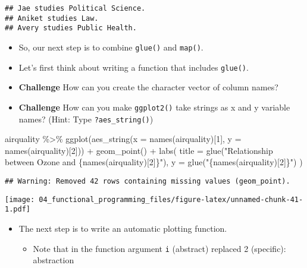 \documentclass[
]{book}
\newenvironment{Shaded}{\begin{snugshade}}{\end{snugshade}}
\newcommand{\AttributeTok}[1]{\textcolor[rgb]{0.77,0.63,0.00}{#1}}
\newcommand{\DecValTok}[1]{\textcolor[rgb]{0.00,0.00,0.81}{#1}}
\newcommand{\FunctionTok}[1]{\textcolor[rgb]{0.00,0.00,0.00}{#1}}
\newcommand{\NormalTok}[1]{#1}
\newcommand{\SpecialCharTok}[1]{\textcolor[rgb]{0.00,0.00,0.00}{#1}}
\newcommand{\StringTok}[1]{\textcolor[rgb]{0.31,0.60,0.02}{#1}}
\providecommand{\tightlist}{%
  \setlength{\itemsep}{0pt}\setlength{\parskip}{0pt}}
\begin{document}
\begin{verbatim}
## Jae studies Political Science.
## Aniket studies Law.
## Avery studies Public Health.
\end{verbatim}

\begin{itemize}
\item
  So, our next step is to combine \texttt{glue()} and \texttt{map()}.
\item
  Let's first think about writing a function that includes \texttt{glue()}.
\item
  \textbf{Challenge}
  How can you create the character vector of column names?
\item
  \textbf{Challenge}
  How can you make \texttt{ggplot2()} take strings as x and y variable names? (Hint: Type \texttt{?aes\_string()})
\end{itemize}

\begin{Shaded}
\begin{Highlighting}[]
\NormalTok{airquality }\SpecialCharTok{\%\textgreater{}\%}
  \FunctionTok{ggplot}\NormalTok{(}\FunctionTok{aes\_string}\NormalTok{(}\AttributeTok{x =} \FunctionTok{names}\NormalTok{(airquality)[}\DecValTok{1}\NormalTok{], }\AttributeTok{y =} \FunctionTok{names}\NormalTok{(airquality)[}\DecValTok{2}\NormalTok{])) }\SpecialCharTok{+}
  \FunctionTok{geom\_point}\NormalTok{() }\SpecialCharTok{+}
  \FunctionTok{labs}\NormalTok{(}
    \AttributeTok{title =} \FunctionTok{glue}\NormalTok{(}\StringTok{"Relationship between Ozone and \{names(airquality)[2]\}"}\NormalTok{),}
    \AttributeTok{y =} \FunctionTok{glue}\NormalTok{(}\StringTok{"\{names(airquality)[2]\}"}\NormalTok{)}
\NormalTok{  )}
\end{Highlighting}
\end{Shaded}

\begin{verbatim}
## Warning: Removed 42 rows containing missing values (geom_point).
\end{verbatim}

\texttt{[image: 04\_functional\_programming\_files/figure-latex/unnamed-chunk-41-1.pdf]}

\begin{itemize}
\item
  The next step is to write an automatic plotting function.

  \begin{itemize}
  \tightlist
  \item
    Note that in the function argument \texttt{i} (abstract) replaced 2 (specific): abstraction
  \end{itemize}
\end{itemize}
\end{document}
